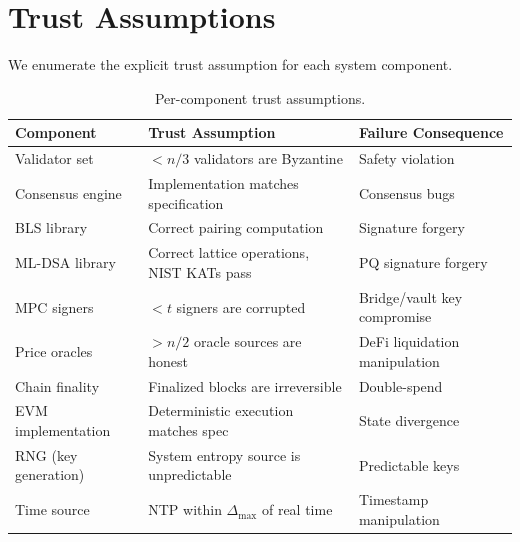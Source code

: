 \section{Trust Assumptions}

\label{sec:trust}

We enumerate the explicit trust assumption for each system component.

\begin{table}[ht]
\centering
\caption{Per-component trust assumptions.}
\label{tab:trust}
\begin{tabular}{p{3cm}p{5cm}p{4cm}}
\toprule
\textbf{Component} & \textbf{Trust Assumption} & \textbf{Failure Consequence} \\
\midrule
Validator set & $< n/3$ validators are Byzantine & Safety violation \\
Consensus engine & Implementation matches specification & Consensus bugs \\
BLS library & Correct pairing computation & Signature forgery \\
ML-DSA library & Correct lattice operations, NIST KATs pass & PQ signature forgery \\
MPC signers & $< t$ signers are corrupted & Bridge/vault key compromise \\
Price oracles & $> n/2$ oracle sources are honest & DeFi liquidation manipulation \\
Chain finality & Finalized blocks are irreversible & Double-spend \\
EVM implementation & Deterministic execution matches spec & State divergence \\
RNG (key generation) & System entropy source is unpredictable & Predictable keys \\
Time source & NTP within $\Delta_{\text{max}}$ of real time & Timestamp manipulation \\
\bottomrule
\end{tabular}
\end{table}

